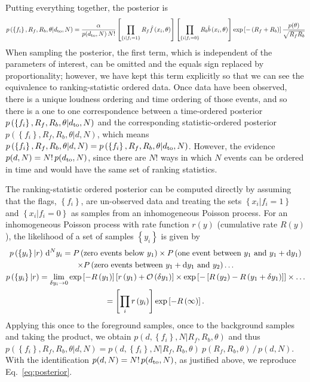 \documentclass[aps,prd]{revtex4-1}
\newcommand{\order}[1]{\mathcal{O}\left( #1 \right)}
\newcommand{\mathset}[1]{\left\{ #1 \right\}}
\begin{document}
Putting everything together, the posterior is
\begin{equation}
  \label{eq:posterior}
  p\left( \mathset{f_i}, R_f, R_b, \theta | d_{\rm to},N \right) =
  \frac{\alpha}{p(d_{\rm to},N)\,N!} \left[ \prod_{\mathset{i | f_i =
        1}} R_f \hat{f}\left(x_i, \theta\right) \right] \left[
    \prod_{\mathset{i | f_i = 0}} R_b \hat{b}\left( x_i, \theta\right)
    \right] \exp\left[ - \left(R_f + R_b\right) \right]
  \frac{p(\theta)}{\sqrt{R_f R_b}}
\end{equation}
When sampling the posterior, the first term, which is independent of
the parameters of interest, can be omitted and the equals sign
replaced by proportionality; however, we have kept this term
explicitly so that we can see the equivalence to ranking-statistic
ordered data. Once data have been observed, there is a unique loudness
ordering and time ordering of those events, and so there is a one to
one correspondence between a time-ordered posterior $p\left(
\mathset{f_i}, R_f, R_b, \theta | d_{\rm to},N \right)$ and the
corresponding statistic-ordered posterior $ p\left( \mathset{f_i},
R_f, R_b, \theta | d,N \right)$, which means $p\left( \mathset{f_i},
R_f, R_b, \theta | d,N \right) = p\left( \mathset{f_i}, R_f, R_b,
\theta | d_{\rm to},N \right)$. However, the evidence $p(d,N) =
N!\,p(d_{\rm to},N)$, since there are $N!$ ways in which $N$ events
can be ordered in time and would have the same set of ranking
statistics.

The ranking-statistic ordered posterior can be computed directly by
assuming that the flags, $\mathset{f_i}$, are un-observed data and
treating the sets $\mathset{x_i | f_i = 1}$ and $\mathset{x_i | f_i =
  0}$ as samples from an inhomogeneous Poisson process.  For an
inhomogeneous Poisson process with rate function $r(y)$ (cumulative
rate $R(y)$), the likelihood of a set of samples $\mathset{y_i}$ is
given by
\begin{multline}
  p\left( \mathset{y_i} | r \right) \,{\rm d}^Ny_i= P\left(
  \textnormal{zero events below } y_1 \right) \times P\left(
  \textnormal{one event between } y_1 \textnormal{ and } y_1 + {\rm
    d}y_1 \right) \\ \times P\left( \textnormal{zero events between }
  y_1+{\rm d}y_1 \textnormal{ and } y_2 \right) \ldots \\ p\left(
  \mathset{y_i} | r \right) = \lim_{\delta y_i \to 0} \exp\left[ -
    R\left(y_1\right) \right] \left[ r\left( y_1 \right) +
    \order{\delta y_1} \right] \times \exp\left[ - \left[ R\left( y_2
      \right) - R\left( y_1 + \delta y_1\right) \right] \right] \times
  \ldots \\ = \left[\prod_i r\left( y_i \right)\right] \exp\left[ -
    R\left( \infty \right) \right].
\end{multline}
Applying this once to the foreground samples, once to the background
samples and taking the product, we obtain $p(d,\mathset{f_i}, N | R_f,
R_b, \theta)$ and thus $p(\mathset{f_i}, R_f, R_b, \theta | d,N) =
p(d,\mathset{f_i}, N | R_f, R_b, \theta)\ p(R_f, R_b, \theta)\, /\,
p(d,N)$. With the identification $p(d,N) = N!\,p(d_{\rm to},N)$, as
justified above, we reproduce Eq.~\eqref{eq:posterior}.
\end{document}
